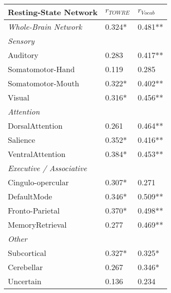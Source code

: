 \begin{tabular}{L{5cm}L{2cm}L{2cm}}
\toprule
Resting-State Network & $r_{TOWRE}$ & $r_{Vocab}$ \\
\midrule
\textit{Whole-Brain Network}           &  0.324* & 0.481** \\
\textit{Sensory} & & \\
\hspace{3pt}Auditory          &        0.283 &       0.417**  \\
\hspace{3pt}Somatomotor-Hand  &        0.119 &       0.285    \\
\hspace{3pt}Somatomotor-Mouth &        0.322* &       0.402** \\
\hspace{3pt}Visual            &        0.316* &       0.456** \\
\textit{Attention} & & \\
\hspace{3pt}DorsalAttention   &        0.261 &       0.464**  \\
\hspace{3pt}Salience          &        0.352* &       0.416** \\
\hspace{3pt}VentralAttention  &        0.384* &       0.453** \\
\textit{Executive / Associative} & & \\
\hspace{3pt}Cingulo-opercular &        0.307* &       0.271   \\
\hspace{3pt}DefaultMode       &        0.346* &       0.509** \\
\hspace{3pt}Fronto-Parietal   &        0.370* &       0.498** \\
\hspace{3pt}MemoryRetrieval   &        0.277 &       0.469**  \\
\textit{Other} & & \\
\hspace{3pt}Subcortical       &        0.327* &       0.325*  \\
\hspace{3pt}Cerebellar        &        0.267 &       0.346*   \\
\hspace{3pt}Uncertain         &        0.136 &       0.234    \\
\bottomrule
\end{tabular}